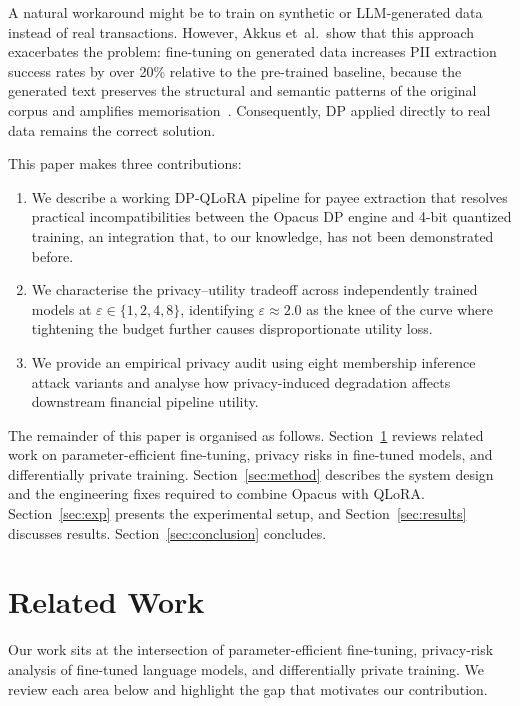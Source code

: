 \documentclass[conference]{IEEEtran}
\begin{document}
A natural workaround might be to train on synthetic or LLM-generated data instead of real transactions. However, Akkus et~al.\ show that this approach exacerbates the problem: fine-tuning on generated data increases PII extraction success rates by over 20\% relative to the pre-trained baseline, because the generated text preserves the structural and semantic patterns of the original corpus and amplifies memorisation~\cite{akkus2025}. Consequently, DP applied directly to real data remains the correct solution.

This paper makes three contributions:
\begin{enumerate}
  \item We describe a working DP-QLoRA pipeline for payee extraction that resolves practical incompatibilities between the Opacus DP engine and 4-bit quantized training, an integration that, to our knowledge, has not been demonstrated before.
  \item We characterise the privacy--utility tradeoff across independently trained models at $\varepsilon \in \{1, 2, 4, 8\}$, identifying $\varepsilon \approx 2.0$ as the knee of the curve where tightening the budget further causes disproportionate utility loss.
  \item We provide an empirical privacy audit using eight membership inference attack variants and analyse how privacy-induced degradation affects downstream financial pipeline utility.
\end{enumerate}

The remainder of this paper is organised as follows. Section~\ref{sec:related} reviews related work on parameter-efficient fine-tuning, privacy risks in fine-tuned models, and differentially private training. Section~\ref{sec:method} describes the system design and the engineering fixes required to combine Opacus with QLoRA. Section~\ref{sec:exp} presents the experimental setup, and Section~\ref{sec:results} discusses results. Section~\ref{sec:conclusion} concludes.

\section{Related Work}
\label{sec:related}

Our work sits at the intersection of parameter-efficient fine-tuning, privacy-risk analysis of fine-tuned language models, and differentially private training. We review each area below and highlight the gap that motivates our contribution.
\end{document}
